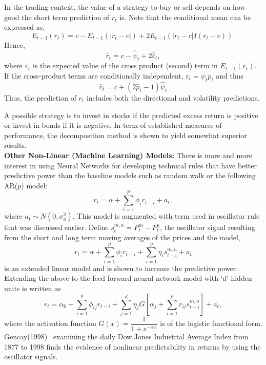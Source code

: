 In the trading context, the value of a strategy to buy or sell depends on how good the short term prediction of $r_{t}$ is. Note that the conditional mean can be expressed as,
	\[
	E_{t-1}(r_t) = c - E_{t-1}(\left| r_t - c \right|) + 2 E_{t-1}(\left| r_t - c \right| I(r_t - c)).
	\]
Hence,
	\begin{equation} \label{eqn:hatrt}
	\hat{r}_{t} = c - \hat{\psi}_{t} + 2 \hat{\varepsilon}_t,
	\end{equation}
where $\varepsilon_t$ is the expected value of the cross product (second) term in $E_{t-1}(r_t)$. If the cross-product terms are conditionally independent, $\varepsilon_t = \psi_t p_t$ and thus
	\begin{equation} \label{eqn:hatrt2}
	\hat{r}_t = c + (2\hat{p}_t - 1)\hat{\psi}_t
	\end{equation}
Thus, the prediction of $r_{t}$ includes both the directional and volatility predictions.


A possible strategy is to invest in stocks if the predicted excess return is positive or invest in bonds if it is negative. In term of established measures of performance, the decomposition method is shown to yield somewhat superior results. \\


\noindent\textbf{Other Non-Linear (Machine Learning) Models:} There is more and more interest in using Neural Networks for developing technical rules that have better predictive power than the baseline models such as random walk or the following AR($p$) model:
	\begin{equation} \label{eqn:ri}
	r_t = \alpha + \sum_{i=1}^p\phi_ir_{t-i} + a_t,
	\end{equation}
where $a_t \sim N(0, \sigma_a^2)$. This model is augmented with term used in oscillator rule that was discussed earlier. Define $s_t^{m,n} = P_t^m - P_t^n$, the oscillator signal resulting from the short and long term moving averages of the prices and the model,
	\begin{equation} \label{eqn:rtsum}
	r_t = \alpha + \sum_{i=1}^p\phi_ir_{t-i} + \sum_{i=1}^p\eta_is_{t-i}^{m,n}+ a_t
	\end{equation}
is an extended linear model and is shown to increase the predictive power. Extending the above to the feed forward neural network model with `$d$' hidden units is written as
	\begin{equation} \label{eqn:rtsum2}
	r_t = \alpha_0 + \sum_{i=1}^p \phi_{ij}r_{t-i} + \sum_{j=1}^d \eta_j G\left[\alpha_j + \sum_{i=1}^pr_{ij}s_{t-i}^{m,n} \right] + a_t,
	\end{equation}
where the activation function $G(x) = \dfrac{1}{1 + e^{-\alpha x}}$ is of the logistic functional form. Gencay(1998)~\cite{gencay} examining the daily Dow Jones Industrial Average Index from 1877 to 1998 finds the evidence of nonlinear predictability in returns by using the oscillator signals.

